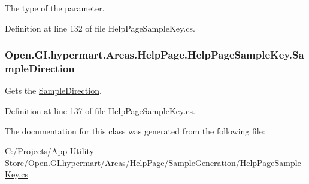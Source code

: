 The type of the parameter. 

Definition at line 132 of file Help\+Page\+Sample\+Key.\+cs.

\hypertarget{class_open_1_1_g_i_1_1hypermart_1_1_areas_1_1_help_page_1_1_help_page_sample_key_a62a3b3c50ce55cf2b20b4f859776f884}{}
\subsubsection[{Sample\+Direction}]{ Open.\+G\+I.\+hypermart.\+Areas.\+Help\+Page.\+Help\+Page\+Sample\+Key.\+Sample\+Direction\hspace{0.3cm}{\ttfamily [get]}}\label{class_open_1_1_g_i_1_1hypermart_1_1_areas_1_1_help_page_1_1_help_page_sample_key_a62a3b3c50ce55cf2b20b4f859776f884}


Gets the \hyperlink{class_open_1_1_g_i_1_1hypermart_1_1_areas_1_1_help_page_1_1_help_page_sample_key_a62a3b3c50ce55cf2b20b4f859776f884}{Sample\+Direction}. 



Definition at line 137 of file Help\+Page\+Sample\+Key.\+cs.



The documentation for this class was generated from the following file\+:\begin{DoxyCompactItemize}
\item 
C\+:/\+Projects/\+App-\/\+Utility-\/\+Store/\+Open.\+G\+I.\+hypermart/\+Areas/\+Help\+Page/\+Sample\+Generation/\hyperlink{_help_page_sample_key_8cs}{Help\+Page\+Sample\+Key.\+cs}\end{DoxyCompactItemize}
